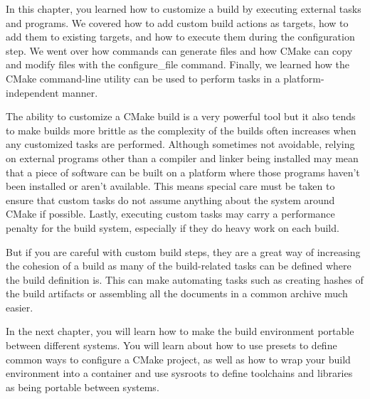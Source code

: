 In this chapter, you learned how to customize a build by executing external tasks and programs. We covered how to add custom build actions as targets, how to add them to existing targets, and how to execute them during the configuration step. We went over how commands can generate files and how CMake can copy and modify files with the configure\_file command. Finally, we learned how the CMake command-line utility can be used to perform tasks in a platform-independent manner.

The ability to customize a CMake build is a very powerful tool but it also tends to make builds more brittle as the complexity of the builds often increases when any customized tasks are performed. Although sometimes not avoidable, relying on external programs other than a compiler and linker being installed may mean that a piece of software can be built on a platform where those programs haven't been installed or aren't available. This means special care must be taken to ensure that custom tasks do not assume anything about the system around CMake if possible. Lastly, executing custom tasks may carry a performance penalty for the build system, especially if they do heavy work on each build.

But if you are careful with custom build steps, they are a great way of increasing the cohesion of a build as many of the build-related tasks can be defined where the build definition is. This can make automating tasks such as creating hashes of the build artifacts or assembling all the documents in a common archive much easier.

In the next chapter, you will learn how to make the build environment portable between different systems. You will learn about how to use presets to define common ways to configure a CMake project, as well as how to wrap your build environment into a container and use sysroots to define toolchains and libraries as being portable between systems.